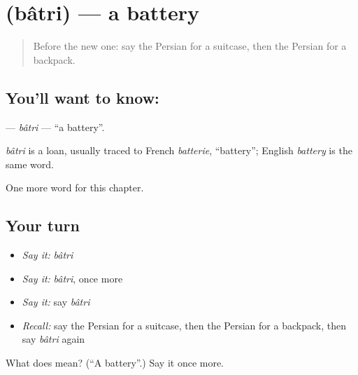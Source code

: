 \section[\texorpdfstring{\fa{باتری} (bâtri)}{باتری (bâtri)}]{ (bâtri) — a battery}

\label{lesson:FA-C112-batri}



\begin{quote}
Before the new one: say the Persian for a suitcase, then the Persian for a backpack.
\end{quote}

\subsection*{You'll want to know: }
\textbf{} — \emph{bâtri} — \textquotedblleft{}a battery\textquotedblright{}.

\begin{cousinweb}
\emph{bâtri} is a loan, usually traced to French \emph{batterie}, \textquotedblleft{}battery\textquotedblright{}; English \emph{battery} is the same word.
\end{cousinweb}

\begin{grammarlens}[title={What you've built}]
One more word for this chapter.
\end{grammarlens}

\subsection*{Your turn}
\begin{itemize}
\raggedright
  \item \emph{Say it:} \emph{bâtri}
  \item \emph{Say it:} \emph{bâtri}, once more
  \item \emph{Say it:} say \emph{bâtri}
  \item \emph{Recall:} say the Persian for a suitcase, then the Persian for a backpack, then say \emph{bâtri} again
\end{itemize}

\begin{tcolorbox}[breakable,colback=teal!4,colframe=teal!35!black,title={Before you move on}]
What does  mean? (\textquotedblleft{}A battery\textquotedblright{}.) Say it once more.
\end{tcolorbox}
